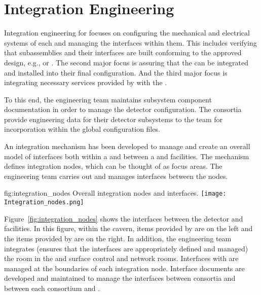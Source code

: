 \section{Integration Engineering}
\label{sec:es-coord-integ-sysengr}

Integration engineering for  focuses on configuring the
mechanical and electrical systems of each  and managing
the interfaces within them. This includes verifying that subassemblies
and their interfaces are built conforming to the approved design,
e.g.,  or . The second major focus
is assuring that the  can be integrated and
installed into their final configuration. And the third major focus is
integrating necessary services provided by  
with the .


To this end, the  engineering team maintains
subsystem component documentation in order to manage the detector
configuration.
The consortia provide engineering data for their detector subsystems to the  team for incorporation within the global configuration files.


An integration mechanism has been developed to manage and create an
overall model of interfaces both within a  and
between a  and facilities. The mechanism defines
integration nodes, which can be thought of as focus areas.  The  engineering team carries out and
manages interfaces between the nodes. 
\begin{dunefigure}{fig:integration_nodes}
  {Overall integration nodes and interfaces.}
  \texttt{[image: Integration\_nodes.png]}
\end{dunefigure}

Figure~\ref{fig:integration_nodes} shows the interfaces between the
detector and facilities. In this figure, within the cavern, items
provided by  are on the left and the items provided by
 are on the right. In addition, the  engineering
team integrates (ensures that the interfaces are appropriately defined
and managed) the  room in the  and surface
control and network rooms. Interfaces with 
are managed at the boundaries of each integration node.  
Interface documents are developed and maintained to manage the
interfaces between consortia and between each consortium and 
.


